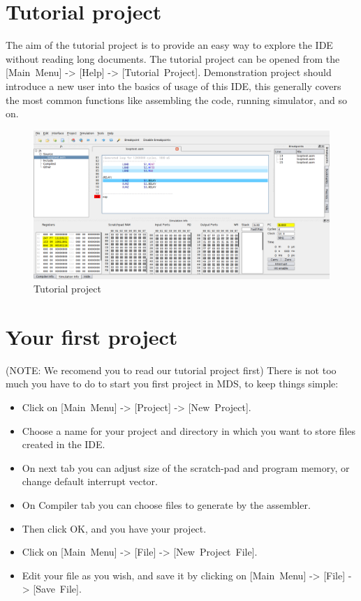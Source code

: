 
\section{Tutorial project}
    The aim of the tutorial project is to provide an easy way to explore the IDE without reading long documents.
    The tutorial project can be opened from the [Main~Menu] -> [Help] -> [Tutorial~Project]. Demonstration project
    should introduce a new user into the basics of usage of this IDE, this generally covers the most common functions
    like assembling the code, running simulator, and so on.
    \begin{figure}[h]
        \centering{}
        \includegraphics[width=\textwidth]{img/demonstration_1.png}
        \caption{Tutorial project}
    \end{figure}

\section{Your first project}
    (NOTE: We recomend you to read our tutorial project first) There is not too much you have to do to start you first project in MDS, to keep things simple:
    \begin{itemize}
        \item Click on [Main~Menu] -> [Project] -> [New~Project].
        \item Choose a name for your project and directory in which you want to store files created in the IDE.
        \item On next tab you can adjust size of the scratch-pad and program memory, or change default interrupt vector.
        \item On Compiler tab you can choose files to generate by the assembler.
        \item Then click OK, and you have your project.
        \item Click on [Main~Menu] -> [File] -> [New~Project~File].
        \item Edit your file as you wish, and save it by clicking on [Main~Menu] -> [File] -> [Save~File].
    \end{itemize}

